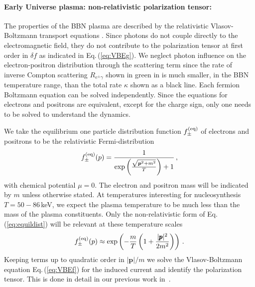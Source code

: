 \paragraph{Early Universe plasma: non-relativistic polarization tensor:}\label{sec:kinetic_theory}
The properties of the BBN plasma are described by the relativistic Vlasov-Boltzmann transport equations . Since photons do not couple directly to the electromagnetic field, they do not contribute to the polarization tensor at first order in $\delta f$ as indicated in Eq.\,(\ref{eq:VBEg}). We neglect photon influence on the electron-positron distribution through the scattering term since the rate of inverse Compton scattering $R_{e^{\pm}\gamma }$ shown in green in  is much smaller, in the BBN temperature range, than the total rate $\kappa$ shown as a black line. Each fermion Boltzmann equation  can be solved independently. Since the equations for electrons and positrons are equivalent, except for the charge sign, only one needs to be solved to understand the dynamics.


We take the equilibrium one particle distribution function $f_\pm^{(\mathrm{eq})}$ of electrons and positrons to be the relativistic Fermi-distribution
\begin{equation}\label{eq:equildist}
f^{(\mathrm{eq})}_\pm(p) = \frac{1}{\exp{\left(\frac{\sqrt{\boldsymbol{p}^2 + m^2}}{T}\right)}
+1}\,,
\end{equation}
with chemical potential $\mu = 0 $. The electron and positron mass will be indicated by $m$ unless otherwise stated. At temperatures interesting for nucleosynthesis $T = 50-86$\,keV, we expect the plasma temperature to be much less than the mass of the plasma constituents. Only the non-relativistic form of Eq.\,(\ref{eq:equildist}) will be relevant at these temperature scales
\begin{equation}
f^{(\mathrm{eq})}_\pm(p) \approx \exp\left(- \frac{m}{T}\left(1+\frac{|\pmb{p}|^2}{2m^2}\right)\right)\,.
\end{equation}
Keeping terms up to quadratic order in $|\boldsymbol{p}|/m$ we solve the Vlasov-Boltzmann equation Eq.\,(\ref{eq:VBEf}) for the induced current and identify the polarization tensor. This is done in detail in our previous work in~\cite{Formanek:2021blc}.

